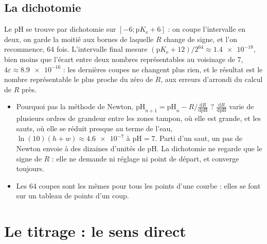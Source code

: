 \documentclass[a4paper,11pt]{article}
\newcommand\pH{\ensuremath{\mathrm{pH}}\xspace}
\newcommand\pKe{\ensuremath{\mathrm{p}K_\mathrm{e}}\xspace}
\newcommand\ddp[2]{\frac{\mathrm{d}#1}{\mathrm{d}#2}}
\newcommand\eps{\varepsilon}
\begin{document}
\subsection{La dichotomie}\label{sec:dichotomie}
\begin{algo}
Le \pH se trouve par dichotomie sur $[-6;\pKe+6]$ : on coupe l'intervalle en deux, on garde la moitié aux bornes de laquelle $R$ change de signe, et l'on recommence, 64 fois.
L'intervalle final mesure $(\pKe+12)/2^{64}\approx\num{1.4e-18}$, bien moins que l'écart entre deux nombres représentables au voisinage de 7, $4\eps\approx\num{8.9e-16}$ : les dernières coupes ne changent plus rien, et le résultat est le nombre représentable le plus proche du zéro de $R$, aux erreurs d'arrondi du calcul de $R$ près.
\begin{itemize}
\item Pourquoi pas la méthode de Newton, $\pH_{n+1}=\pH_n-R\big/\ddp R\pH$ ?
$\ddp R\pH$ varie de plusieurs ordres de grandeur entre les zones tampon, où elle est grande, et les sauts, où elle se réduit presque au terme de l'eau, $\ln(10)(h+w)\approx\num{4.6e-7}$ à $\pH=7$.
Parti d'un saut, un pas de Newton envoie à des dizaines d'unités de \pH.
La dichotomie ne regarde que le signe de $R$ : elle ne demande ni réglage ni point de départ, et converge toujours.
\item Les 64 coupes sont les mêmes pour tous les points d'une courbe : elles se font sur un tableau de points d'un coup.
\end{itemize}
\end{algo}

\section{Le titrage : le sens direct}\label{sec:direct}
\end{document}

